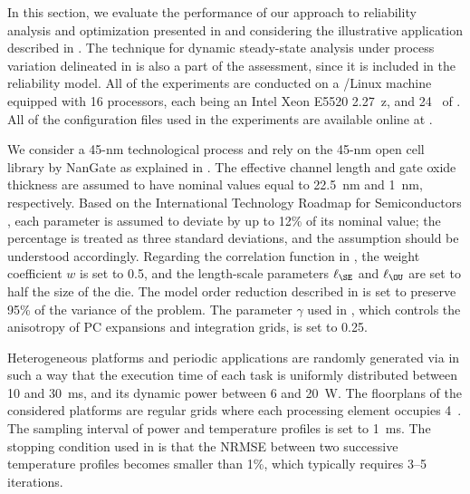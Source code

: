 In this section, we evaluate the performance of our approach to reliability
analysis and optimization presented in  and
 considering the illustrative application described in
. The technique for dynamic steady-state
analysis under process variation delineated in
 is also a part of the assessment, since it
is included in the reliability model. All of the experiments are conducted on a
/Linux machine equipped with 16 processors, each being an Intel Xeon
E5520 2.27~z, and 24~ of . All of the configuration files
used in the experiments are available online at \cite{eslab2015}.

We consider a 45-nm technological process and rely on the 45-nm open cell
library by NanGate \cite{nangate} as explained in
. The effective channel length and gate
oxide thickness are assumed to have nominal values equal to 22.5~nm and 1~nm,
respectively. Based on the International Technology Roadmap for Semiconductors
\cite{itrs}, each parameter is assumed to deviate by up to 12\% of its nominal
value; the percentage is treated as three standard deviations, and the
assumption should be understood accordingly. Regarding the correlation function
in , the weight coefficient $w$ is set to 0.5, and the
length-scale parameters $\ell_\SE$ and $\ell_\OU$ are set to half the size of
the die. The model order reduction described in
 is set to preserve 95\% of the variance of the
problem. The parameter $\gamma$ used in , which
controls the anisotropy of \ac{PC} expansions and integration grids, is set to
0.25.

Heterogeneous platforms and periodic applications are randomly generated via
 \cite{dick1998} in such a way that the execution time of each task is
uniformly distributed between 10 and 30~ms, and its dynamic power between 6 and
20~W. The floorplans of the considered platforms are regular grids where each
processing element occupies 4~. The sampling interval \dt of power
and temperature profiles is set to 1~ms. The stopping condition used in
 is that the \ac{NRMSE} between
two successive temperature profiles becomes smaller than 1\%, which typically
requires 3--5 iterations.


